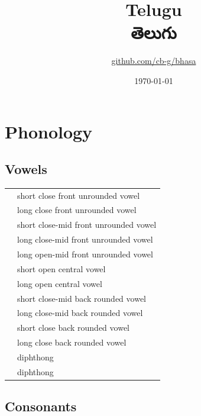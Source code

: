 \documentclass{article}
\title{Telugu\\{\telugufont తెలుగు}\\\ipa{["telugu]}}
\author{\href{https://github.com/cb-g/bhasa}{github.com/cb-g/bhasa}}
\date{\today}
\begin{document}
\pagecolor{custom_bg}\color{custom_fg}
\maketitle\thispagestyle{empty}

\newpage\setcounter{page}{1}\section{Phonology}

\subsection{Vowels}

\begin{xltabular}{\textwidth}{lL}
   & short close front unrounded vowel \\
   & long close front unrounded vowel \\
   & short close-mid front unrounded vowel \\
   & long close-mid front unrounded vowel \\
   & long open-mid front unrounded vowel \\
   & short open central vowel \\
   & long open central vowel \\
   & short close-mid back rounded vowel \\
   & long close-mid back rounded vowel \\
   & short close back rounded vowel \\
   & long close back rounded vowel \\
   & diphthong \\
   & diphthong \\
\end{xltabular}

\subsection{Consonants}
\end{document}
